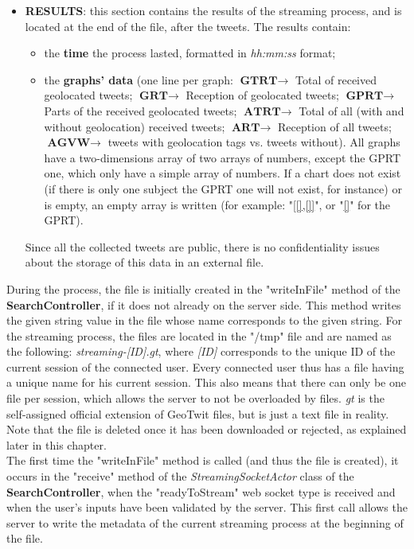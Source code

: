 \documentclass[a4paper,11pt]{report}
\begin{document}
\begin{itemize}
	\item \textbf{RESULTS}: this section contains the results of the streaming process, and is located at the end of the file, after the tweets. The results contain:
	\begin{itemize}
		\item the \textbf{time} the process lasted, formatted in \emph{hh:mm:ss} format;
		\item the \textbf{graphs' data} (one line per graph: $\textbf{GTRT}\to$ Total of received geolocated tweets; $\textbf{GRT}\to$ Reception of geolocated tweets; $\textbf{GPRT}\to$ Parts of the received geolocated tweets; $\textbf{ATRT}\to$ Total of all (with and without geolocation) received tweets; $\textbf{ART}\to$ Reception of all tweets; $\textbf{AGVW}\to$ tweets with geolocation tags vs. tweets without). All graphs have a two-dimensions array of two arrays of numbers, except the GPRT one, which only have a simple array of numbers. If a chart does not exist (if there is only one subject the GPRT one will not exist, for instance) or is empty, an empty array is written (for example: "\underline{[[],[]]}", or "\underline{[]}" for the GPRT).
	\end{itemize}
	Since all the collected tweets are public, there is no confidentiality issues about the storage of this data in an external file.
\end{itemize}

During the process, the file is initially created in the "writeInFile" method of the \textbf{SearchController}, if it does not already on the server side. This method writes the given string value in the file whose name corresponds to the given string. For the streaming process, the files are located in the "/tmp" file and are named as the following: \emph{streaming-[ID].gt}, where \emph{[ID]} corresponds to the unique ID of the current session of the connected user. Every connected user thus has a file having a unique name for his current session. This also means that there can only be one file per session, which allows the server to not be overloaded by files. \emph{gt} is the self-assigned official extension of GeoTwit files, but is just a text file in reality. Note that the file is deleted once it has been downloaded or rejected, as explained later in this chapter.\\

The first time the "writeInFile" method is called (and thus the file is created), it occurs in the "receive" method of the \emph{StreamingSocketActor} class of the \textbf{SearchController}, when the "readyToStream" web socket type is received and when the user's inputs have been validated by the server. This first call allows the server to write the metadata of the current streaming process at the beginning of the file.\\
\end{document}
